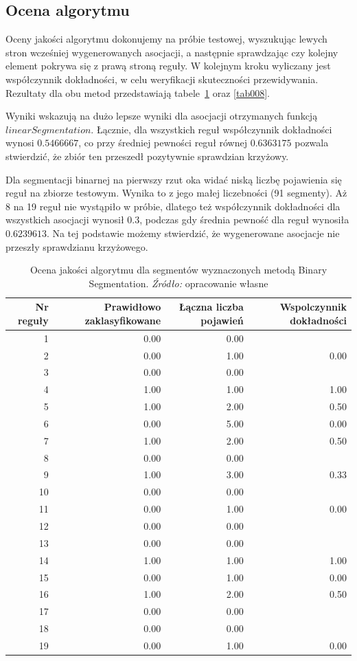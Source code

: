 \documentclass[polish, twoside, 12pt, a4paper]{article}
\theoremstyle{definition}
\theoremstyle{plain}
\theoremstyle{remark}
\begin{document}
\subsection{Ocena algorytmu}

Oceny jakości algorytmu dokonujemy na próbie testowej, wyszukując lewych stron wcześniej wygenerowanych asocjacji, a następnie sprawdzając czy kolejny element pokrywa się 
z prawą stroną reguły. W kolejnym kroku wyliczany jest współczynnik dokładności, w celu weryfikacji skuteczności przewidywania. Rezultaty dla obu metod przedstawiają tabele~\ref{tab007} 
oraz \ref{tab008}.

Wyniki wskazują na dużo lepsze wyniki dla asocjacji otrzymanych funkcją \(linearSegmentation\). Łącznie, dla wszystkich reguł współczynnik dokładności wynosi \(0.5466667\), co przy średniej 
pewności reguł równej \(0.6363175\) pozwala stwierdzić, że zbiór ten przeszedł pozytywnie sprawdzian krzyżowy.

 Dla segmentacji binarnej na pierwszy rzut oka widać niską liczbę pojawienia 
się reguł na zbiorze testowym. Wynika to z jego małej liczebności (91 segmenty). Aż 8 na 19 reguł nie wystąpiło w próbie, dlatego też współczynnik dokładności dla wszystkich asocjacji 
wynosił \(0.3\), podczas gdy średnia pewność dla reguł wynosiła \(0.6239613\). Na tej podstawie możemy stwierdzić, że wygenerowane asocjacje nie przeszły sprawdzianu krzyżowego. 

\begin{table}[H]
\caption{Ocena jakości algorytmu dla segmentów wyznaczonych metodą Binary Segmentation. \textit{Źródło:} opracowanie własne}
\label{tab007}
\begin{tabular}{rrrr}
Nr reguły & Prawidłowo zaklasyfikowane & Łączna liczba pojawień & Wspolczynnik dokładności \\ 
  \hline
1 & 0.00 & 0.00 &  \\ 
 2 & 0.00 & 1.00 & 0.00 \\ 
 3 & 0.00 & 0.00 &  \\ 
 4 & 1.00 & 1.00 & 1.00 \\ 
 5 & 1.00 & 2.00 & 0.50 \\ 
 6 & 0.00 & 5.00 & 0.00 \\ 
 7 & 1.00 & 2.00 & 0.50 \\ 
 8 & 0.00 & 0.00 &  \\ 
 9 & 1.00 & 3.00 & 0.33 \\ 
 10 & 0.00 & 0.00 &  \\ 
 11 & 0.00 & 1.00 & 0.00 \\ 
 12 & 0.00 & 0.00 &  \\ 
 13 & 0.00 & 0.00 &  \\ 
 14 & 1.00 & 1.00 & 1.00 \\ 
 15 & 0.00 & 1.00 & 0.00 \\ 
 16 & 1.00 & 2.00 & 0.50 \\ 
 17 & 0.00 & 0.00 &  \\ 
 18 & 0.00 & 0.00 &  \\ 
 19 & 0.00 & 1.00 & 0.00 
\end{tabular}
\end{table}
\end{document}
